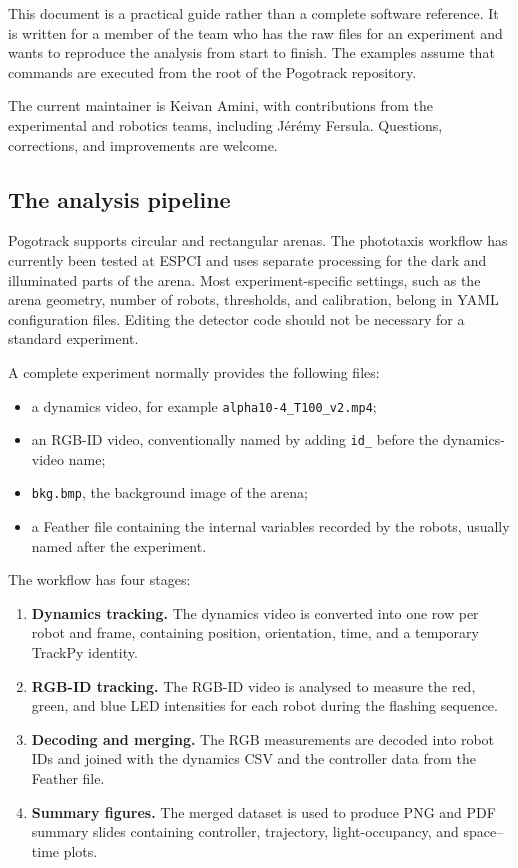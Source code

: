\documentclass[11pt,a4paper]{article}
\begin{document}
This document is a practical guide rather than a complete software reference. It is written for a member of the team who has the raw files for an experiment and wants to reproduce the analysis from start to finish. The examples assume that commands are executed from the root of the Pogotrack repository.

The current maintainer is Keivan Amini, with contributions from the experimental and robotics teams, including Jérémy Fersula. Questions, corrections, and improvements are welcome.

\subsection{The analysis pipeline}

Pogotrack supports circular and rectangular arenas. The phototaxis workflow has currently been tested at ESPCI and uses separate processing for the dark and illuminated parts of the arena. Most experiment-specific settings, such as the arena geometry, number of robots, thresholds, and calibration, belong in YAML configuration files. Editing the detector code should not be necessary for a standard experiment.

A complete experiment normally provides the following files:

\begin{itemize}
  \item a dynamics video, for example \texttt{alpha10-4\_T100\_v2.mp4};
  \item an RGB-ID video, conventionally named by adding \texttt{id\_} before the dynamics-video name;
  \item \texttt{bkg.bmp}, the background image of the arena;
  \item a Feather file containing the internal variables recorded by the robots, usually named after the experiment.
\end{itemize}

The workflow has four stages:

\begin{enumerate}
  \item \textbf{Dynamics tracking.} The dynamics video is converted into one row per robot and frame, containing position, orientation, time, and a temporary TrackPy identity.
  \item \textbf{RGB-ID tracking.} The RGB-ID video is analysed to measure the red, green, and blue LED intensities for each robot during the flashing sequence.
  \item \textbf{Decoding and merging.} The RGB measurements are decoded into robot IDs and joined with the dynamics CSV and the controller data from the Feather file.
  \item \textbf{Summary figures.} The merged dataset is used to produce PNG and PDF summary slides containing controller, trajectory, light-occupancy, and space--time plots.
\end{enumerate}
\end{document}
